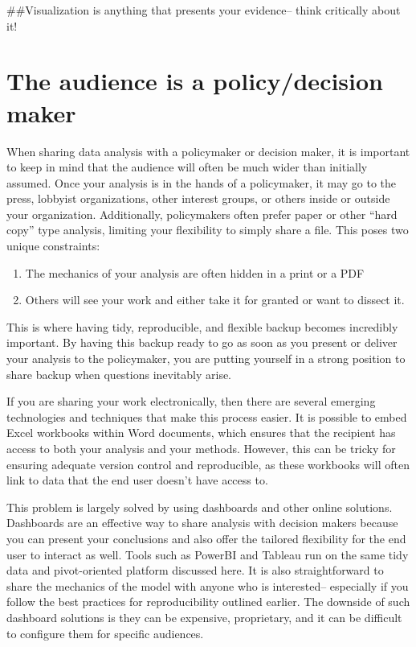 \documentclass[]{book}
\providecommand{\tightlist}{%
  \setlength{\itemsep}{0pt}\setlength{\parskip}{0pt}}
\begin{document}
\#\#Visualization is anything that presents your evidence-- think critically about it!

\hypertarget{the-audience-is-a-policydecision-maker}{%
\section{The audience is a policy/decision maker}\label{the-audience-is-a-policydecision-maker}}

When sharing data analysis with a policymaker or decision maker, it is important to keep in mind that the audience will often be much wider than initially assumed. Once your analysis is in the hands of a policymaker, it may go to the press, lobbyist organizations, other interest groups, or others inside or outside your organization. Additionally, policymakers often prefer paper or other ``hard copy'' type analysis, limiting your flexibility to simply share a file. This poses two unique constraints:

\begin{enumerate}
\def\labelenumi{\arabic{enumi})}
\tightlist
\item
  The mechanics of your analysis are often hidden in a print or a PDF
\item
  Others will see your work and either take it for granted or want to dissect it.
\end{enumerate}

This is where having tidy, reproducible, and flexible backup becomes incredibly important. By having this backup ready to go as soon as you present or deliver your analysis to the policymaker, you are putting yourself in a strong position to share backup when questions inevitably arise.

If you are sharing your work electronically, then there are several emerging technologies and techniques that make this process easier. It is possible to embed Excel workbooks within Word documents, which ensures that the recipient has access to both your analysis and your methods. However, this can be tricky for ensuring adequate version control and reproducible, as these workbooks will often link to data that the end user doesn't have access to.

This problem is largely solved by using dashboards and other online solutions. Dashboards are an effective way to share analysis with decision makers because you can present your conclusions and also offer the tailored flexibility for the end user to interact as well. Tools such as PowerBI and Tableau run on the same tidy data and pivot-oriented platform discussed here. It is also straightforward to share the mechanics of the model with anyone who is interested-- especially if you follow the best practices for reproducibility outlined earlier. The downside of such dashboard solutions is they can be expensive, proprietary, and it can be difficult to configure them for specific audiences.
\end{document}
